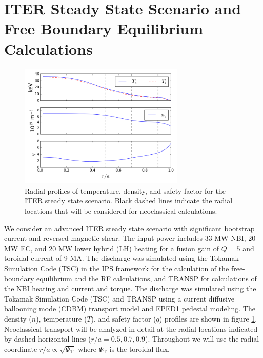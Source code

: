 \documentclass[aip, pop, preprint]{revtex4-1}
\numberwithin{figure}{section}
\numberwithin{equation}{section}
\begin{document}
\section{ITER Steady State Scenario and Free Boundary Equilibrium Calculations} \label{vmec}

\FloatBarrier

\begin{figure}[h!]
\centering
\includegraphics[width=0.7\textwidth]{profiles.png}
\caption{\label{fig:profiles} Radial profiles of temperature, density, and safety factor for the ITER steady state scenario.\cite{Poli2014} Black dashed lines indicate the radial locations that will be considered for neoclassical calculations.}
\end{figure}

We consider an advanced ITER steady state scenario with significant bootstrap current and reversed magnetic shear.\cite{Poli2014} The input power includes 33 MW NBI, 20 MW EC, and 20 MW lower hybrid (LH) heating for a fusion gain of $Q = 5$ and toroidal current of 9 MA. The discharge was simulated using the Tokamak Simulation Code (TSC) in the IPS\cite{Elwasif2010} framework for the calculation of the free-boundary equilibrium and the RF calculations, and TRANSP for calculations of the NBI heating and current and torque. The discharge was simulated using the Tokamak Simulation Code (TSC) \cite{Jardin1986} and TRANSP \cite{Hawryluk1980} using a current diffusive ballooning mode (CDBM)\cite{Fukuyama1995,Fukuyama1998} transport model and EPED1\cite{Snyder2011} pedestal modeling. The density ($n$), temperature ($T$), and safety factor ($q$) profiles are shown in figure \ref{fig:profiles}. Neoclassical transport will be analyzed in detail at the radial locations indicated by dashed horizontal lines ($r/a = 0.5, 0.7, 0.9$). Throughout we will use the radial coordinate $r/a \propto \sqrt{\Psi_{\text{T}}}$ where $\Psi_{\text{T}}$ is the toroidal flux.
\end{document}
